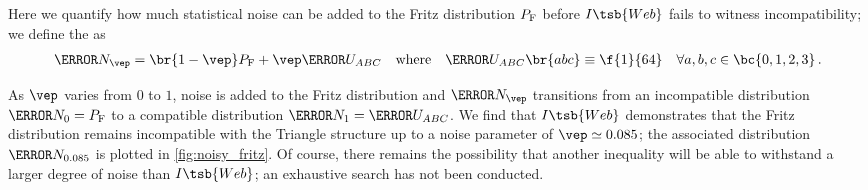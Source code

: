 \documentclass[aps, 10pt, english, twoside, pra, nofootinbib, tightenlines, longbibliography, superscriptaddress]{revtex4-1}
\begin{document}
    Here we quantify how much statistical noise can be added to the Fritz distribution $\prob[\fritz]$ before $I\tsb{Web}$ fails to witness incompatibility; we define the  as
    \begin{align}
        \begin{split}
            \s{N}_{\vep} = \br{1 - \vep} \prob[\fritz] + \vep \s{U}_{ABC} \quad \text{where} \quad \s{U}_{ABC}\br{abc} \equiv \f{1}{64} \quad \forall a,b,c\in \bc{0,1,2,3}\,. \\
        \end{split}
    \end{align}

    As $\vep$ varies from $0$ to $1$, noise is added to the Fritz distribution and $\s{N}_{\vep}$ transitions from an incompatible distribution $\s{N}_{0} = \prob[\fritz]$ to a compatible distribution $\s{N}_{1} = \s{U}_{ABC}$. We find that $I\tsb{Web}$ demonstrates that the Fritz distribution remains incompatible with the Triangle structure up to a noise parameter of $\vep \simeq 0.085$; the associated distribution $\s N_{0.085}$ is plotted in \cref{fig:noisy_fritz}. Of course, there remains the possibility that another inequality will be able to withstand a larger degree of noise than $I\tsb{Web}$; an exhaustive search has not been conducted.


\end{document}
